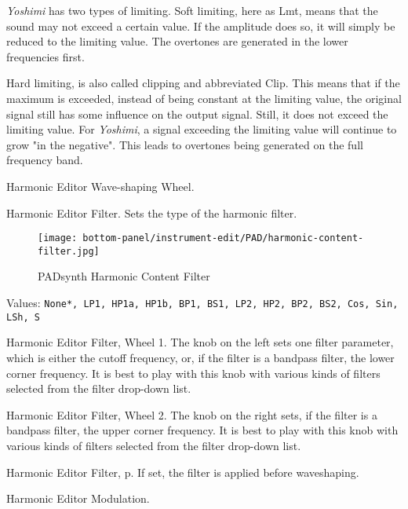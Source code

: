    \textsl{Yoshimi} has two types of limiting. Soft limiting, here as Lmt, means
   that the sound may not exceed a certain value. If the amplitude does so,
   it will simply be reduced to the limiting value. The overtones are
   generated in the lower frequencies first.

   Hard limiting, is also called clipping and abbreviated Clip. This means
   that if the maximum is exceeded, instead of being constant at the limiting
   value, the original signal still has some influence on the output signal.
   Still, it does not exceed the limiting value. For \textsl{Yoshimi}, a signal
   exceeding the limiting value will continue to grow "in the negative". This
   leads to overtones being generated on the full frequency band.

   Harmonic Editor Wave-shaping Wheel.

   Harmonic Editor Filter.
   Sets the type of the harmonic filter.

\begin{figure}[H]
   \centering
   \texttt{[image: bottom-panel/instrument-edit/PAD/harmonic-content-filter.jpg]}
   \caption{PADsynth Harmonic Content Filter}
   \label{fig:}
\end{figure}

   Values: \texttt{None*, LP1, HP1a, HP1b, BP1, BS1, LP2, HP2, BP2,
              BS2, Cos, Sin, LSh, S}

   Harmonic Editor Filter, Wheel 1.
   The knob on the left sets one filter parameter, which is either the cutoff
   frequency, or, if the filter is a bandpass filter, the lower corner
   frequency.
   It is best to play with this knob with various kinds of filters selected
   from the filter drop-down list.

   Harmonic Editor Filter, Wheel 2.
   The knob on the right sets, if the filter is a bandpass filter, the upper
   corner frequency.
   It is best to play with this knob with various kinds of filters selected
   from the filter drop-down list.

   Harmonic Editor Filter, p.
   If set, the filter is applied before waveshaping.

   Harmonic Editor Modulation.

